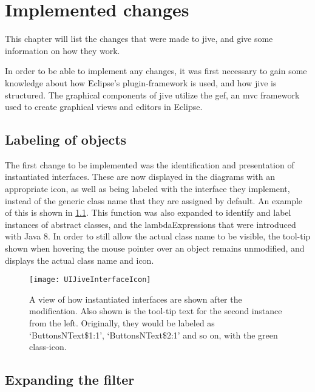 \chapter{Implemented changes}\label{jiveImpl}%

This chapter will list the changes that were made to \gls{jive}, and give some information on how they work.

In order to be able to implement any changes, it was first necessary to gain some knowledge about how Eclipse's plugin-framework is used, and how \gls{jive} is structured.
The graphical components of \gls{jive} utilize the \gls{gef}, an \gls{mvc} framework used to create graphical views and editors in Eclipse.

\section{Labeling of objects}\label{implLabel}

The first change to be implemented was the identification and presentation of instantiated interfaces.
These are now displayed in the diagrams with an appropriate icon, as well as being labeled with the interface they implement, instead of the generic class name that they are assigned by default.
An example of this is shown in \cref{fig:JiveNewIcon}.
This function was also expanded to identify and label instances of abstract classes, and the \glspl{lambdaExpression} that were introduced with Java 8.
In order to still allow the actual class name to be visible, the tool-tip shown when hovering the mouse pointer over an object remains unmodified, and displays the actual class name and icon.
\begin{figure}[H]
	\centering
	\texttt{[image: UIJiveInterfaceIcon]}
	\caption[A view of how instantiated interfaces are shown after the modification.]{A view of how instantiated interfaces are shown after the modification. Also shown is the tool-tip text for the second instance from the left. Originally, they would be labeled as `ButtonsNText\$1:1', `ButtonsNText\$2:1' and so on, with the green class-icon.}
	\label{fig:JiveNewIcon}
\end{figure}

\section{Expanding the filter}\label{implFilter}


